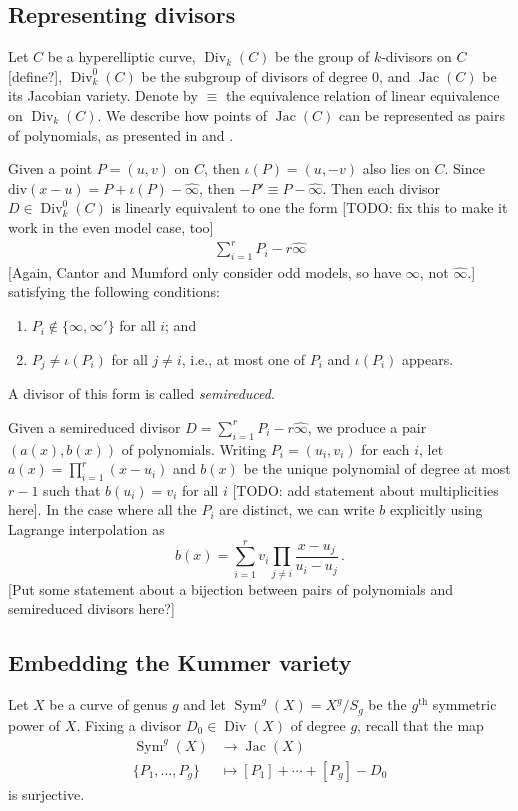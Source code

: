 \documentclass[reqno, 12pt]{amsart}
\theoremstyle{definition}
\renewcommand{\div}{\text{div}}
\newcommand{\wh}{\widehat}
\DeclareMathOperator{\Jac}{Jac}
\DeclareMathOperator{\Div}{Div}
\DeclareMathOperator{\Sym}{Sym}
\newcommand{\whinfty}{\wh{\infty}}
\newcommand{\sss}[1]{{\color{blue} [#1]}}
\begin{document}
\subsection{Representing divisors}
Let $C$ be a hyperelliptic curve, $\Div_k(C)$ be the group of $k$-divisors on $C$ \sss{define?}, $\Div^0_k(C)$ be the subgroup of divisors of degree $0$, and $\Jac(C)$ be its Jacobian variety. Denote by $\equiv$ the equivalence relation of linear equivalence on $\Div_k(C)$. We describe how points of $\Jac(C)$ can be represented as pairs of polynomials, as presented in \cite{Cantor} and \cite[\S1]{Mumford}.

Given a point $P = (u,v)$ on $C$, then $\iota(P) = (u,-v)$ also lies on $C$. Since $\div(x - u) = P + \iota(P) - \wh{\infty}$, then $-P' \equiv P - \wh{\infty}$. Then each divisor $D \in \Div^0_k(C)$ is linearly equivalent to one the form \sss{TODO: fix this to make it work in the even model case, too}
\begin{align} \label{semireduced}
\sum_{i=1}^r P_i - r \whinfty
\end{align}
\sss{Again, Cantor and Mumford only consider odd models, so have $\infty$, not $\whinfty$.}
satisfying the following conditions:
\begin{enumerate}
\item
$P_i \notin \{\infty, \infty'\}$ for all $i$; and

\item
$P_j \neq \iota(P_i)$ for all $j \neq i$, i.e., at most one of $P_i$ and $\iota(P_i)$ appears.
\end{enumerate}
A divisor of this form is called \textit{semireduced}.

Given  a semireduced divisor $D = \sum_{i=1}^r P_i - r \whinfty$, we produce a pair $(a(x), b(x))$ of polynomials. Writing $P_i = (u_i, v_i)$ for each $i$, let $a(x) = \prod_{i = 1}^r (x - u_i)$ and $b(x)$ be the unique polynomial of degree at most $r-1$ such that $b(u_i) = v_i$ for all $i$ \sss{TODO: add statement about multiplicities here}. In the case where all the $P_i$ are distinct, we can write $b$ explicitly using Lagrange interpolation as
$$
b(x) = \sum_{i=1}^r  v_i \prod_{j \neq i} \frac{x - u_j}{u_i - u_j} \, .
$$
\sss{Put some statement about a bijection between pairs of polynomials and semireduced divisors here?}

\subsection{Embedding the Kummer variety}
Let $X$ be a curve of genus $g$ and let $\Sym^g(X) = X^g/S_g$ be the $g^\text{th}$ symmetric power of $X$. Fixing a divisor $D_0 \in \Div(X)$ of degree $g$, recall that the map
\begin{align*}
\Sym^g(X) &\to \Jac(X)\\
\{P_1, \ldots, P_g\} &\mapsto [P_1] + \cdots + [P_g] - D_0
\end{align*}
is surjective.
\end{document}
